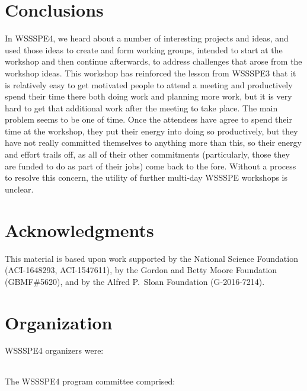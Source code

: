 \documentclass[11pt, oneside]{amsart}
\newcommand{\todo}[1]{{\color{blue}$\blacksquare$~\textsf{[TODO: #1]}}}
\begin{document}
\section{Conclusions} \label{sec:conclusions}

In WSSSPE4, we heard about a number of interesting projects and ideas, and used those
ideas to create and form working groups, intended to start at the workshop and then
continue afterwards, to address challenges that arose from the workshop ideas.  This workshop
has reinforced the lesson from WSSSPE3 that it is relatively easy to get motivated people
to attend a meeting and productively spend their time there both doing work and planning
more work, but it is very hard to get that additional work after the meeting to take place.
The main problem seems to be one of time.  Once the attendees have agree to spend
their time at the workshop, they put their energy into doing so productively, but they have not
really committed themselves to anything more than this, so their energy and effort trails
off, as all of their other commitments (particularly, those they are funded to do as part of
their jobs) come back to the fore. Without a process to resolve this concern, the utility of
further multi-day WSSSPE workshops is unclear.



\section*{Acknowledgments} \label{sec:acks}

This material is based upon work supported by the National Science Foundation (ACI-1648293, ACI-1547611),
by the Gordon and Betty Moore Foundation (GBMF\#5620),
and by the Alfred P.~Sloan Foundation (G-2016-7214).


\newpage
\appendix
\section{Organization}  \label{sec:orgcom}

WSSSPE4 organizers were:

{\scriptsize
\begin{longtable}{lll}

\end{longtable}
}


The WSSSPE4 program committee comprised:

{\scriptsize
\begin{longtable}{lll}

\end{longtable}
}


\newpage



\end{document}
